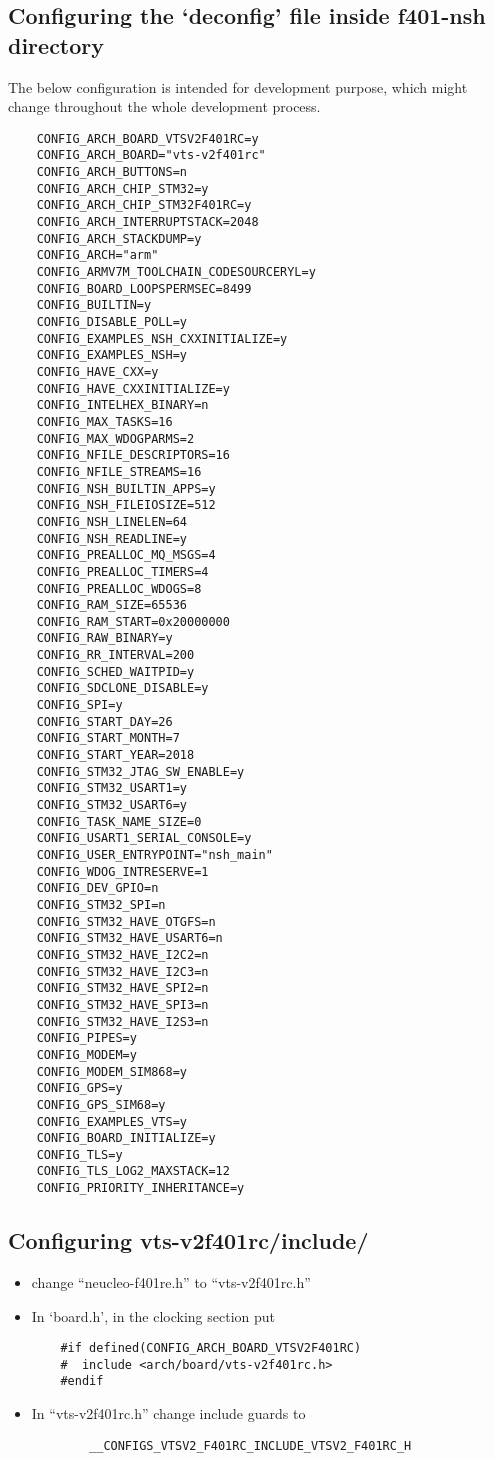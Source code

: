 \subsection*{Configuring the ‘deconfig’ file inside f401-nsh directory}
The below configuration is intended for development purpose, which might change throughout the whole development process.
\begin{verbatim}
	CONFIG_ARCH_BOARD_VTSV2F401RC=y
	CONFIG_ARCH_BOARD="vts-v2f401rc"
	CONFIG_ARCH_BUTTONS=n
	CONFIG_ARCH_CHIP_STM32=y
	CONFIG_ARCH_CHIP_STM32F401RC=y
	CONFIG_ARCH_INTERRUPTSTACK=2048
	CONFIG_ARCH_STACKDUMP=y
	CONFIG_ARCH="arm"
	CONFIG_ARMV7M_TOOLCHAIN_CODESOURCERYL=y
	CONFIG_BOARD_LOOPSPERMSEC=8499
	CONFIG_BUILTIN=y
	CONFIG_DISABLE_POLL=y
	CONFIG_EXAMPLES_NSH_CXXINITIALIZE=y
	CONFIG_EXAMPLES_NSH=y
	CONFIG_HAVE_CXX=y
	CONFIG_HAVE_CXXINITIALIZE=y
	CONFIG_INTELHEX_BINARY=n
	CONFIG_MAX_TASKS=16
	CONFIG_MAX_WDOGPARMS=2
	CONFIG_NFILE_DESCRIPTORS=16
	CONFIG_NFILE_STREAMS=16
	CONFIG_NSH_BUILTIN_APPS=y
	CONFIG_NSH_FILEIOSIZE=512
	CONFIG_NSH_LINELEN=64
	CONFIG_NSH_READLINE=y
	CONFIG_PREALLOC_MQ_MSGS=4
	CONFIG_PREALLOC_TIMERS=4
	CONFIG_PREALLOC_WDOGS=8
	CONFIG_RAM_SIZE=65536
	CONFIG_RAM_START=0x20000000
	CONFIG_RAW_BINARY=y
	CONFIG_RR_INTERVAL=200
	CONFIG_SCHED_WAITPID=y
	CONFIG_SDCLONE_DISABLE=y
	CONFIG_SPI=y
	CONFIG_START_DAY=26
	CONFIG_START_MONTH=7
	CONFIG_START_YEAR=2018
	CONFIG_STM32_JTAG_SW_ENABLE=y
	CONFIG_STM32_USART1=y
	CONFIG_STM32_USART6=y
	CONFIG_TASK_NAME_SIZE=0
	CONFIG_USART1_SERIAL_CONSOLE=y
	CONFIG_USER_ENTRYPOINT="nsh_main"
	CONFIG_WDOG_INTRESERVE=1
	CONFIG_DEV_GPIO=n
	CONFIG_STM32_SPI=n
	CONFIG_STM32_HAVE_OTGFS=n
	CONFIG_STM32_HAVE_USART6=n
	CONFIG_STM32_HAVE_I2C2=n
	CONFIG_STM32_HAVE_I2C3=n
	CONFIG_STM32_HAVE_SPI2=n
	CONFIG_STM32_HAVE_SPI3=n
	CONFIG_STM32_HAVE_I2S3=n
	CONFIG_PIPES=y
	CONFIG_MODEM=y
	CONFIG_MODEM_SIM868=y
	CONFIG_GPS=y
	CONFIG_GPS_SIM68=y
	CONFIG_EXAMPLES_VTS=y
	CONFIG_BOARD_INITIALIZE=y
	CONFIG_TLS=y
	CONFIG_TLS_LOG2_MAXSTACK=12
	CONFIG_PRIORITY_INHERITANCE=y
\end{verbatim}

\subsection*{Configuring  vts-v2f401rc/include/}
\begin{itemize}
	\item change “neucleo-f401re.h” to “vts-v2f401rc.h”
	\item In ‘board.h’, in the clocking section put
	\begin{verbatim}
	#if defined(CONFIG_ARCH_BOARD_VTSV2F401RC)
	#  include <arch/board/vts-v2f401rc.h>
	#endif
	\end{verbatim}
	
	\item In “vts-v2f401rc.h” change include guards to
	\begin{verbatim}
		__CONFIGS_VTSV2_F401RC_INCLUDE_VTSV2_F401RC_H
	\end{verbatim}
\end{itemize}

